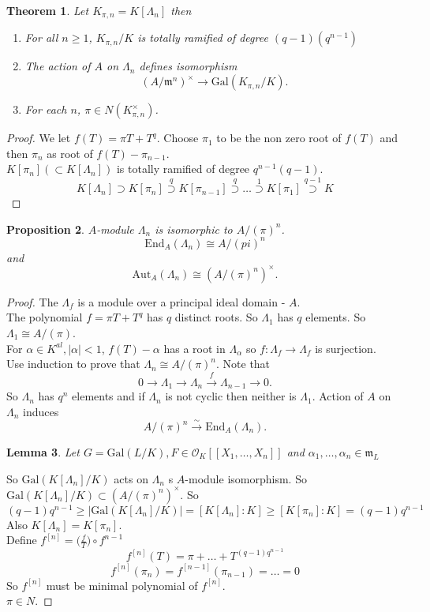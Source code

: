 \documentclass[twoside, 12pt]{iiser-thesis}
\newtheorem{thm}{{Theorem}}[section]
\newtheorem{prop}[thm]{ Proposition}
\newtheorem{lem}[thm]{ Lemma}
\newcommand{\gal}{\text{Gal}}
\begin{document}
\begin{thm} Let $K_{\pi, n}=K[\Lambda _n]$ then
\begin{enumerate}
    \item For all $n \geq 1$, $K_{\pi ,n }/K$ is totally ramified of degree $(q-1)(q^{n-1})$
    \item The action of $A$ on $\Lambda _n$ defines isomorphism $$(A/ \mathfrak m ^n)^\times \rightarrow \gal (K_{\pi,n}/K).$$
    \item For each $n$, $\pi \in N(K^\times_{\pi,n})$.
\end{enumerate}
\end{thm}
\begin{proof}
We let $f(T) = \pi T + T^q$. Choose $\pi _1$ to be the non zero root of $f(T)$ and then $\pi _n$ as root of $f(T) - \pi _{n-1}$. \\
$K[\pi _n] (\subset K[\Lambda _n])$ is totally ramified of degree $q^{n-1} (q-1)$.
$$ K[\Lambda _n] \supset K[\pi _n] \stackrel{q}{\supset} K[\pi _{n-1}] \stackrel{q}{\supset} \dots \stackrel{1}{\supset} K[\pi _1] \stackrel{q-1}{\supset} K$$ 
\end{proof}
\begin{prop}
$A$-module $\Lambda _n$ is isomorphic to $A/(\pi)^n$. $$\text{End}_A(\Lambda _n) \cong A/(pi)^n$$ and $$ \text{Aut}_A (\Lambda _n) \cong (A/(\pi)^n)^\times .$$
\end{prop}
\begin{proof}
The $\Lambda _f$ is a module over a principal ideal domain - $A$. \\
The polynomial $f=\pi T +T^q$ has $q$ distinct roots. So $\Lambda _1$ has $q$ elements. So $\Lambda _1 \cong A/(\pi)$. \\ For $\alpha \in K^{al} , |\alpha | <1$, $f(T) - \alpha $ has a root in $\Lambda _\alpha$ so $f : \Lambda _f \rightarrow \Lambda _f $ is surjection. \\
Use induction to prove that $\Lambda _n \cong A/(\pi )^n$.
Note that $$ 0 \rightarrow \Lambda _1 \rightarrow \Lambda _n \xrightarrow{f} \Lambda _{n-1} \rightarrow 0.$$
So $\Lambda _n$ has $q^n$ elements and if $\Lambda _n$ is not cyclic then neither is $\Lambda _1$.  Action of $A$ on $\Lambda _n$ induces $$A/(\pi)^n \xrightarrow{\sim} \text{End}_A(\Lambda _n).$$
\begin{lem}
Let $G = \gal (L/K), F \in \mathcal O_K [[X_1, \dots , X_n]]$ and $\alpha _1, \dots , \alpha _n \in \mathfrak m _L$
\end{lem}
So $\gal (K[\Lambda _n]/K) $ acts on $\Lambda _n$ s $A$-module isomorphism. So $\gal (K[\Lambda _n]/K)\subset (A/(\pi)^n)^\times$. So $$(q-1)q^{n-1} \geq |\gal(K[\Lambda _n]/K)|=[K[\Lambda _n]:K] \geq [K[\pi _n]:K]=(q-1)q^{n-1}$$
Also $K[\Lambda _n ]=K[\pi _n]$. \\
Define $f^{[n]}=\Big ( \frac{f}{T} \Big )\circ f^{n-1}$ $$f^{[n]}(T) = \pi + \dots + T^{(q-1)q^{n-1}}$$ $$f^{[n]} (\pi _n) =f^{[n-1]} (\pi _{n-1}) = \dots =0$$
So $f^{[n]}$ must be minimal polynomial of $f^{[n]}$.\\
$\pi \in N$.
\end{proof}
\end{document}
